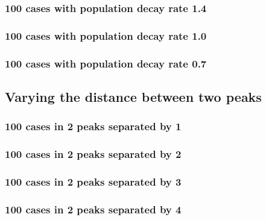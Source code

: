 \subsubsection{100 cases with population decay rate 1.4}


\subsubsection{100 cases with population decay rate 1.0}


\subsubsection{100 cases with population decay rate 0.7}


\subsection{Varying the distance between two peaks}

\subsubsection{100 cases in 2 peaks separated by 1}


\subsubsection{100 cases in 2 peaks separated by 2}


\subsubsection{100 cases in 2 peaks separated by 3}


\subsubsection{100 cases in 2 peaks separated by 4}



